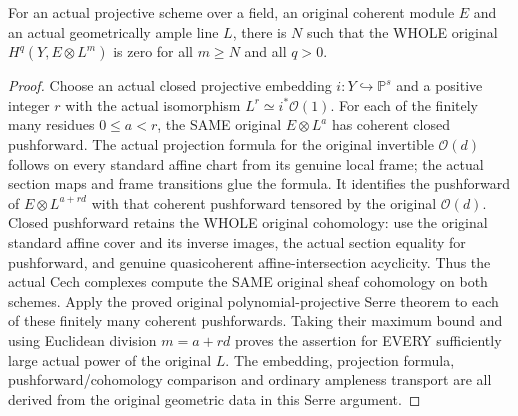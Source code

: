 \begin{lemma}
\label{lem:vanishing-original-ample-serre}
\leanok
{}
For an actual projective scheme over a field, an original coherent
module $E$ and an actual geometrically ample line $L$, there is $N$ such
that the WHOLE original $H^q(Y,E\otimes L^m)$ is zero for all $m\ge N$
and all $q>0$.
\end{lemma}
\begin{proof}
Choose an actual closed projective embedding $i:Y\hookrightarrow
\mathbb P^s$ and a positive integer $r$ with the actual isomorphism
$L^r\simeq i^*\mathcal O(1)$. For each of the finitely many residues
$0\le a<r$, the SAME original $E\otimes L^a$ has coherent closed
pushforward. The actual projection formula for the original invertible
$\mathcal O(d)$ follows on every standard affine chart from its genuine
local frame; the actual section maps and frame transitions glue the
formula. It identifies the pushforward of
$E\otimes L^{a+rd}$ with that coherent pushforward tensored by the
original $\mathcal O(d)$. Closed pushforward retains the WHOLE original
cohomology: use the original standard affine cover and its inverse
images, the actual section equality for pushforward, and genuine
quasicoherent affine-intersection acyclicity. Thus the actual Cech
complexes compute the SAME original sheaf cohomology on both schemes.
Apply the proved original polynomial-projective Serre theorem to each
of these finitely many coherent pushforwards. Taking their maximum
bound and using Euclidean division $m=a+rd$ proves the assertion for
EVERY sufficiently large actual power of the original $L$. The
embedding, projection formula, pushforward/cohomology comparison and
ordinary ampleness transport are all derived from the original
geometric data in this Serre argument.
\end{proof}

